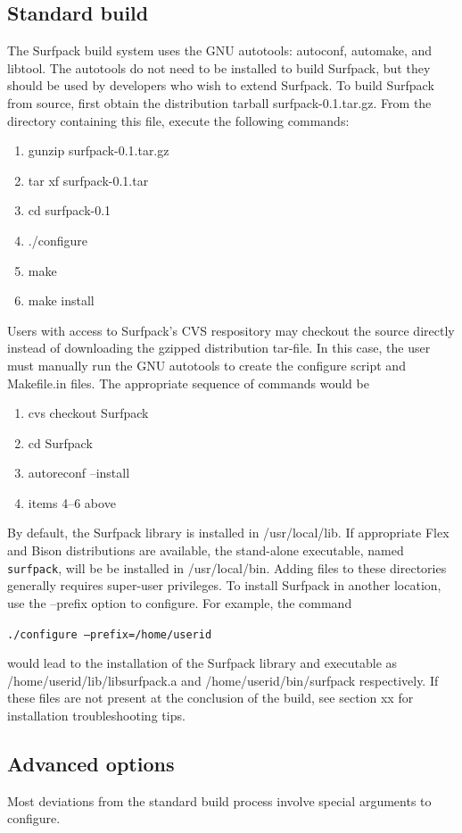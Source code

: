 \documentclass{article}
\begin{document}
\subsection{Standard build}
The Surfpack build system uses the GNU autotools: autoconf, automake, and libtool.  The autotools do not need to be installed to build Surfpack, but they should be used by developers who wish to extend Surfpack.  To build Surfpack from source, first obtain the distribution tarball surfpack-0.1.tar.gz.  From the directory containing this file, execute the following commands:
\begin{enumerate}
\item gunzip surfpack-0.1.tar.gz
\item tar xf surfpack-0.1.tar
\item cd surfpack-0.1
\item ./configure
\item make
\item make install
\end{enumerate}

Users with access to Surfpack's CVS respository may checkout the source directly instead of downloading the gzipped distribution tar-file.  In this case, the user must manually run the GNU autotools to create the configure script and Makefile.in files.  The appropriate sequence of commands would be
\begin{enumerate}
\item cvs checkout Surfpack
\item cd Surfpack
\item autoreconf --install
\item items 4--6 above
\end{enumerate}
By default, the Surfpack library is installed in /usr/local/lib.  If appropriate Flex and Bison distributions are available, the stand-alone executable, named \texttt{surfpack}, will be be installed in /usr/local/bin.  Adding files to these directories generally requires super-user privileges.  To install Surfpack in another location, use the --prefix option to configure.  For example, the command

\texttt{./configure --prefix=/home/userid}

would lead to the installation of the Surfpack library and executable as /home/userid/lib/libsurfpack.a and /home/userid/bin/surfpack respectively. If these files are not present at the conclusion of the build, see section xx for installation troubleshooting tips.
\subsection{Advanced options}
Most deviations from the standard build process involve special arguments to configure.
\end{document}
